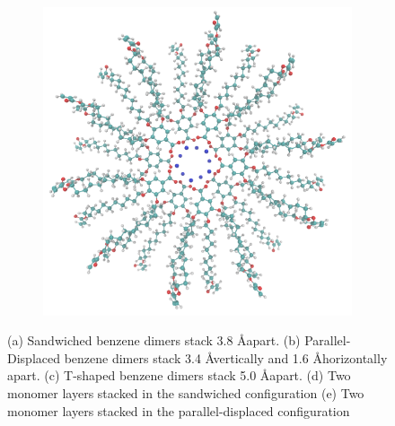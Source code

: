 \documentclass{article}
\newcommand{\angstrom}{\textup{\AA}}
\begin{document}
\begin{figure}[!ht]
\begin{subfigure}[b]{0.475\textwidth}
		\caption{}\label{fig:sandwichedlayers}
	\end{subfigure}
	\begin{subfigure}[b]{0.475\textwidth}
		\centering
		\includegraphics[width=\textwidth]{offsetlayers.png}
		\caption{}\label{fig:offsetlayers}
	\end{subfigure}
	\caption{(a) Sandwiched benzene dimers stack 3.8 \angstrom apart. (b) Parallel-Displaced benzene dimers stack
	3.4 \angstrom vertically and 1.6 \angstrom horizontally apart. (c) T-shaped benzene dimers stack 5.0 \angstrom apart. 
	(d) Two monomer layers stacked in the sandwiched configuration (e) Two monomer layers stacked in the parallel-displaced
	configuration }\label{fig:stacking}
  \end{figure}
  
\end{document}

